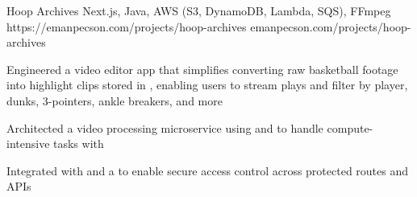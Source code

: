 
\projheader
{Hoop Archives}
{Next.js, Java, AWS (S3, DynamoDB, Lambda, SQS), FFmpeg}
{https://emanpecson.com/projects/hoop-archives}
{emanpecson.com/projects/hoop-archives}

\begin{bullets}
	\item Engineered a video editor app that simplifies converting raw basketball footage into highlight clips stored in , enabling users to stream plays and filter by player, dunks, 3-pointers, ankle breakers, and more

	\item Architected a video processing microservice using  and  to handle compute-intensive tasks with 

	\item Integrated  with  and a  to enable secure access control across protected routes and APIs
	
\end{bullets}
